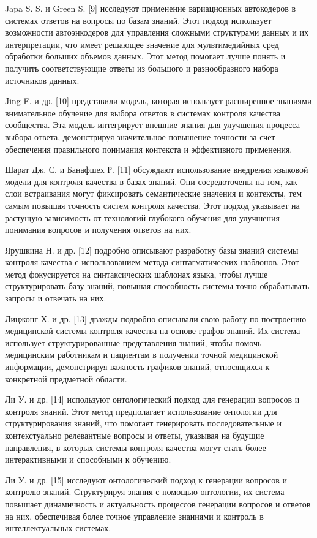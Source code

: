 Japa S. S. и Green S. {[}9{]} исследуют применение вариационных
автокодеров в системах ответов на вопросы по базам знаний. Этот подход
использует возможности автоэнкодеров для управления сложными структурами
данных и их интерпретации, что имеет решающее значение для
мультимедийных сред обработки больших объемов данных. Этот метод
помогает лучше понять и получить соответствующие ответы из большого и
разнообразного набора источников данных.

Jing F. и др. {[}10{]} представили модель, которая использует
расширенное знаниями внимательное обучение для выбора ответов в системах
контроля качества сообщества. Эта модель интегрирует внешние знания для
улучшения процесса выбора ответа, демонстрируя значительное повышение
точности за счет обеспечения правильного понимания контекста и
эффективного применения.

Шарат Дж. С. и Банафшех Р. {[}11{]} обсуждают использование внедрения
языковой модели для контроля качества в базах знаний. Они сосредоточены
на том, как слои встраивания могут фиксировать семантические значения и
контексты, тем самым повышая точность систем контроля качества. Этот
подход указывает на растущую зависимость от технологий глубокого
обучения для улучшения понимания вопросов и получения ответов на них.

Ярушкина Н. и др. {[}12{]} подробно описывают разработку базы знаний
системы контроля качества с использованием метода синтагматических
шаблонов. Этот метод фокусируется на синтаксических шаблонах языка,
чтобы лучше структурировать базу знаний, повышая способность системы
точно обрабатывать запросы и отвечать на них.

Лицжонг Х. и др. {[}13{]} дважды подробно описывали свою работу по
построению медицинской системы контроля качества на основе графов
знаний. Их система использует структурированные представления знаний,
чтобы помочь медицинским работникам и пациентам в получении точной
медицинской информации, демонстрируя важность графиков знаний,
относящихся к конкретной предметной области.

Ли У. и др. {[}14{]} используют онтологический подход для генерации
вопросов и контроля знаний. Этот метод предполагает использование
онтологии для структурирования знаний, что помогает генерировать
последовательные и контекстуально релевантные вопросы и ответы, указывая
на будущие направления, в которых системы контроля качества могут стать
более интерактивными и способными к обучению.

Ли У. и др. {[}15{]} исследуют онтологический подход к генерации
вопросов и контролю знаний. Структурируя знания с помощью онтологии, их
система повышает динамичность и актуальность процессов генерации
вопросов и ответов на них, обеспечивая более точное управление знаниями
и контроль в интеллектуальных системах.

